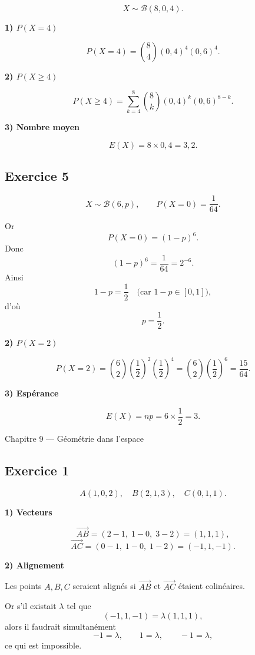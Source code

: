 \documentclass[11pt,a4paper]{article}
\begin{document}
\[
X\sim \mathcal{B}(8,0{,}4).
\]

\textbf{1) \(P(X=4)\)}

\[
P(X=4)=\binom84 (0{,}4)^4(0{,}6)^4.
\]

\textbf{2) \(P(X\geq 4)\)}

\[
P(X\geq 4)=\sum_{k=4}^{8}\binom{8}{k}(0{,}4)^k(0{,}6)^{8-k}.
\]

\textbf{3) Nombre moyen}

\[
E(X)=8\times 0{,}4=3{,}2.
\]

\subsection*{Exercice 5}
\[
X\sim \mathcal{B}(6,p),\qquad P(X=0)=\frac1{64}.
\]

Or
\[
P(X=0)=(1-p)^6.
\]
Donc
\[
(1-p)^6=\frac1{64}=2^{-6}.
\]
Ainsi
\[
1-p=\frac12 \quad \text{(car } 1-p\in[0,1]\text{)},
\]
d'où
\[
p=\frac12.
\]

\textbf{2) \(P(X=2)\)}

\[
P(X=2)=\binom62 \left(\frac12\right)^2\left(\frac12\right)^4
=\binom62 \left(\frac12\right)^6
=\frac{15}{64}.
\]

\textbf{3) Espérance}

\[
E(X)=np=6\times \frac12=3.
\]

\begin{chapitrebox}{Chapitre 9 --- Géométrie dans l'espace}
\end{chapitrebox}

\subsection*{Exercice 1}
\[
A(1,0,2),\quad B(2,1,3),\quad C(0,1,1).
\]

\textbf{1) Vecteurs}

\[
\overrightarrow{AB}=(2-1,\;1-0,\;3-2)=(1,1,1),
\]
\[
\overrightarrow{AC}=(0-1,\;1-0,\;1-2)=(-1,1,-1).
\]

\textbf{2) Alignement}

Les points \(A,B,C\) seraient alignés si \(\overrightarrow{AB}\) et \(\overrightarrow{AC}\) étaient colinéaires.

Or s'il existait \(\lambda\) tel que
\[
(-1,1,-1)=\lambda(1,1,1),
\]
alors il faudrait simultanément
\[
-1=\lambda,\qquad 1=\lambda,\qquad -1=\lambda,
\]
ce qui est impossible.
\end{document}

